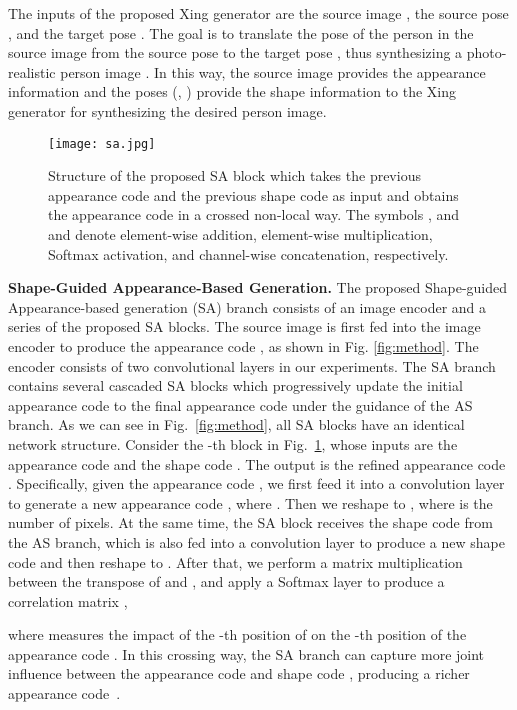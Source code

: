 \documentclass[runningheads]{llncs}
\begin{document}
The inputs of the proposed Xing generator are the source image , the source pose , and the target pose .
The goal is to translate the pose of the person in the source image  from the source pose  to the target pose , thus synthesizing a photo-realistic person image .
In this way, the source image  provides the appearance information and the poses (, ) provide the shape information to the Xing generator for synthesizing the desired person image. 

\begin{figure}[t]
	\centering
	\texttt{[image: sa.jpg]}
	\caption{Structure of the proposed SA block which takes the previous appearance code  and the previous shape code  as input and obtains the appearance code  in a crossed non-local way. The symbols ,  and  and  denote element-wise addition, element-wise multiplication, Softmax activation, and channel-wise concatenation, respectively.}
	\label{fig:sa}
\end{figure}

\noindent \textbf{Shape-Guided Appearance-Based Generation.}
The proposed Shape-guided Appearance-based generation (SA) branch consists of an image encoder and a series of the proposed SA blocks.
The source image  is first fed into the image encoder to produce the appearance code , as shown in Fig. \ref{fig:method}.
The encoder consists of two convolutional layers in our experiments. 
The SA branch contains several cascaded SA blocks which progressively update the initial appearance code  to the final appearance code  under the guidance of the AS branch. 
As we can see in Fig.~\ref{fig:method}, all SA blocks have an identical network structure.
Consider the -th block in Fig.~\ref{fig:sa}, whose inputs are the appearance code  and the shape code . The output is the refined appearance code .
Specifically, given the appearance code , we first feed it into a convolution layer to generate a new appearance code , where . 
Then we reshape  to , where  is the number of pixels.
At the same time, the SA block receives the shape code  from the AS branch, which is also fed into a convolution layer to produce a new shape code  and then reshape to .
After that, we perform a matrix multiplication between the transpose of  and , and apply a Softmax layer to produce a correlation matrix ,

where  measures the impact of the -th position of  on the -th position of the appearance code .
In this crossing way, the SA branch can capture more joint influence between the appearance code  and shape code , producing a richer appearance code~.
\end{document}
